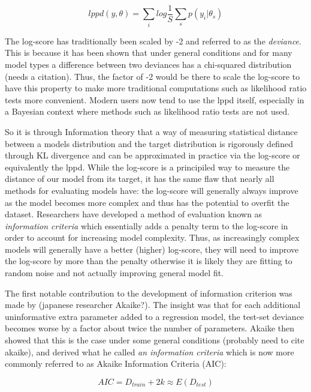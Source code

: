 \begin{equation} \label{eq:lppd}
lppd(y, \theta) = \sum_i log \frac{1}{S} \sum_s p(y_i | \theta_s)
\end{equation}

The log-score has traditionally been scaled by -2 and referred to as the \textit{deviance}. This is because it has been shown that under general conditions and for many model types a difference between two deviances has a chi-squared distribution (needs a citation). Thus, the factor of -2 would be there to scale the log-score to have this property to make more traditional computations such as likelihood ratio tests more convenient. Modern users now tend to use the lppd itself, especially in a Bayesian context where methods such as likelihood ratio tests are not used.

So it is through Information theory that a way of measuring statistical distance between a models distribution and the target distribution is rigorously defined through KL divergence and can be approximated in practice via the log-score or equivalently the lppd. While the log-score is a principiled way to measure the distance of our model from its target, it has the same flaw that nearly all methods for evaluating models have: the log-score will generally always improve as the model becomes more complex and thus has the potential to overfit the dataset. Researchers have developed a method of evaluation known as \textit{information criteria} which essentially adds a penalty term to the log-score in order to account for increasing model complexity. Thus, as increasingly complex models will generally have a better (higher) log-score, they will need to improve the log-score by more than the penalty otherwise it is likely they are fitting to random noise and not actually improving general model fit.

The first notable contribution to the development of information criterion was made by (japanese researcher Akaike?). The insight was that for each additional uninformative extra parameter added to a regression model, the test-set deviance becomes worse by a factor about twice the number of parameters. Akaike then showed that this is the case under some general conditions (probably need to cite akaike), and derived what he called \textit{an information criteria} which is now more commonly referred to as Akaike Information Criteria (AIC):

\begin{equation}
AIC = D_{train} + 2k \approx E(D_{test})
\end{equation}


